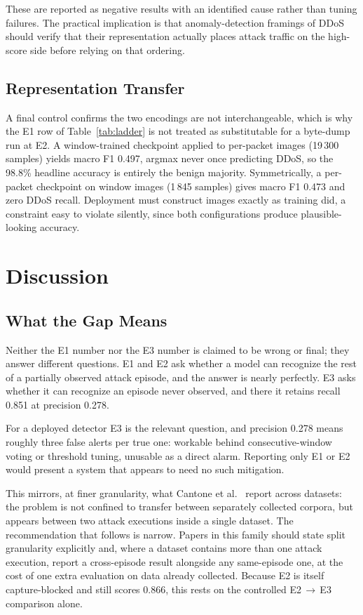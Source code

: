 \documentclass[conference]{IEEEtran} \IEEEoverridecommandlockouts
\begin{document}
These are reported as negative results with an identified cause rather than
tuning failures. The practical implication is that anomaly-detection framings
of DDoS should verify that their representation actually places attack traffic
on the high-score side before relying on that ordering.

\subsection{Representation Transfer} A final control confirms the two encodings
are not interchangeable, which is why the E1 row of Table~\ref{tab:ladder} is
not treated as substitutable for a byte-dump run at E2. A window-trained
checkpoint applied to per-packet images (19\,300 samples) yields macro F1
0.497, argmax never once predicting DDoS, so the 98.8\% headline accuracy is
entirely the benign majority. Symmetrically, a per-packet checkpoint on window
images (1\,845 samples) gives macro F1 0.473 and zero DDoS recall. Deployment
must construct images exactly as training did, a constraint easy to violate
silently, since both configurations produce plausible-looking accuracy.

\section{Discussion}
\label{sec:discussion}

\subsection{What the Gap Means} Neither the E1 number nor the E3 number is
claimed to be wrong or final; they answer different questions. E1 and E2 ask
whether a model can recognize the rest of a partially observed attack episode,
and the answer is nearly perfectly. E3 asks whether it can recognize an episode
never observed, and there it retains recall 0.851 at precision 0.278.

For a deployed detector E3 is the relevant question, and precision 0.278 means
roughly three false alerts per true one: workable behind consecutive-window
voting or threshold tuning, unusable as a direct alarm. Reporting only E1 or E2
would present a system that appears to need no such mitigation.

This mirrors, at finer granularity, what Cantone et
al.~\cite{cantone2024crossdataset} report across datasets: the problem is not
confined to transfer between separately collected corpora, but appears between
two attack executions inside a single dataset. The recommendation that follows
is narrow. Papers in this family should state split granularity explicitly and,
where a dataset contains more than one attack execution, report a cross-episode
result alongside any same-episode one, at the cost of one extra evaluation on
data already collected. Because E2 is itself capture-blocked and still scores
0.866, this rests on the controlled E2\,$\to$\,E3 comparison alone.
\end{document}
